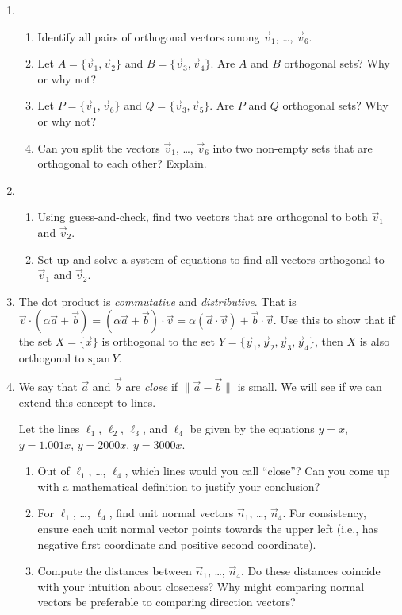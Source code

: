 \documentclass[red]{tutorial}
\newcommand{\Span}{\mathrm{span}\,}
\theoremstyle{definition}
\theoremstyle{theorem}
\begin{document}
\begin{tutorial}
\begin{enumerate}
	\item 
	\begin{enumerate}
		\item Identify all pairs of orthogonal vectors among $\vec v_1$, \ldots, $\vec v_6$.
		\item Let $A=\{\vec v_1, \vec v_2\}$ and $B=\{\vec v_3,\vec v_4\}$. Are $A$ and $B$ orthogonal sets?
			Why or why not?
		\item Let $P=\{\vec v_1, \vec v_6\}$ and $Q=\{\vec v_3,\vec v_5\}$. Are $P$ and $Q$ orthogonal sets?
			Why or why not?
		\item Can you split the vectors $\vec v_1$, \ldots, $\vec v_6$ into two non-empty sets that are orthogonal to
			each other? Explain.
	\end{enumerate}
	\item 
	\begin{enumerate}
		\item Using guess-and-check, find two vectors that are orthogonal to both $\vec v_1$ and $\vec v_2$.
		\item Set up and solve a system of equations to find all vectors orthogonal to $\vec v_1$ and $\vec v_2$.
	\end{enumerate}
	\item The dot product is \emph{commutative} and \emph{distributive}. That is $\vec v\cdot (\alpha\vec a+\vec b)=
		(\alpha\vec a+\vec b)\cdot \vec v=\alpha(\vec a\cdot \vec v)+\vec b\cdot\vec v$. Use this to show that if
		the set $X=\{\vec x\}$ is orthogonal to the set $Y=\{\vec y_1,\vec y_2,\vec y_3,\vec y_4\}$,
		then $X$ is also orthogonal to $\Span Y$.
	
	\item We say that $\vec a$ and $\vec b$ are \emph{close} if $\|\vec a-\vec b\|$ is small. We will see if we can
		extend this concept to lines.

		Let the lines $\ell_1$, $\ell_2$, $\ell_3$, and $\ell_4$ be given by the equations $y=x$, $y=1.001x$,
				$y=2000x$, $y=3000x$.
		\begin{enumerate}
			\item Out of $\ell_1$, \ldots, $\ell_4$, which lines would you call ``close''? Can you come up
				with a mathematical definition to justify your conclusion?
			\item For $\ell_1$, \ldots, $\ell_4$, find unit normal vectors $\vec n_1$, \ldots, $\vec n_4$.
				For consistency, ensure each unit normal vector points towards the upper left (i.e., has negative first coordinate
				and positive second coordinate).
			\item Compute the distances between $\vec n_1$, \ldots, $\vec n_4$. Do these distances coincide with your
				intuition about closeness? Why might comparing normal vectors be preferable to comparing direction vectors?
		\end{enumerate}
	
\end{enumerate}
	\end{tutorial}
\end{document}
